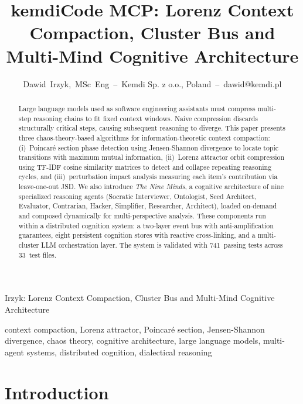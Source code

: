 \documentclass[journal,10pt]{IEEEtran}
\begin{document}
\title{kemdiCode MCP: Lorenz Context Compaction, Cluster Bus and Multi-Mind Cognitive Architecture}

\author{Dawid~Irzyk,~MSc~Eng~--~Kemdi Sp. z o.o., Poland~--~dawid@kemdi.pl}

%
{Irzyk: Lorenz Context Compaction, Cluster Bus and Multi-Mind Cognitive Architecture}

\maketitle

\begin{abstract}
Large language models used as software engineering assistants must compress multi-step reasoning chains to fit fixed context windows. Naive compression discards structurally critical steps, causing subsequent reasoning to diverge. This paper presents three chaos-theory-based algorithms for information-theoretic context compaction: (i)~Poincar\'{e} section phase detection using Jensen-Shannon divergence to locate topic transitions with maximum mutual information, (ii)~Lorenz attractor orbit compression using TF-IDF cosine similarity matrices to detect and collapse repeating reasoning cycles, and (iii)~perturbation impact analysis measuring each item's contribution via leave-one-out JSD. We also introduce \emph{The Nine Minds}, a cognitive architecture of nine specialized reasoning agents (Socratic Interviewer, Ontologist, Seed Architect, Evaluator, Contrarian, Hacker, Simplifier, Researcher, Architect), loaded on-demand and composed dynamically for multi-perspective analysis. These components run within a distributed cognition system: a two-layer event bus with anti-amplification guarantees, eight persistent cognition stores with reactive cross-linking, and a multi-cluster LLM orchestration layer. The system is validated with 741~passing tests across 33~test files.
\end{abstract}

\begin{IEEEkeywords}
context compaction, Lorenz attractor, Poincar\'{e} section, Jensen-Shannon divergence, chaos theory, cognitive architecture, large language models, multi-agent systems, distributed cognition, dialectical reasoning
\end{IEEEkeywords}

\section{Introduction}
\label{sec:intro}
\end{document}
